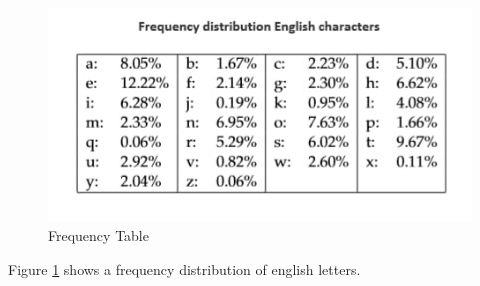 \documentclass[12pt]{report}
\begin{document}
{\begin{figure}
  \includegraphics[width=\linewidth]{freq.jpg}
  \caption{Frequency Table}
  \label{fig:freq1}
\end{figure}

Figure \ref{fig:freq1} shows a frequency distribution of english letters.
\newpage
}
\end{document}
